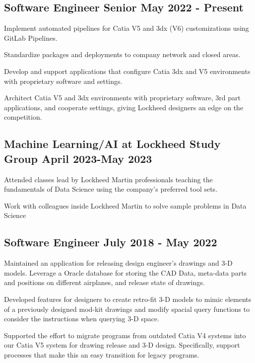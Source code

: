 \subsection{{Software Engineer Senior \hfill May 2022 - Present}}
\begin{zitemize}
\item Implement automated pipelines for Catia V5 and 3dx (V6) customizations using GitLab Pipelines.
\item Standardize packages and deployments to company network and closed areas.
\item Develop and support applications that configure Catia 3dx and V5 environments with proprietary software and settings.
\item Architect Catia V5 and 3dx environments with proprietary software, 3rd part applications, and cooperate settings, giving Lockheed designers an edge on the competition. 
\end{zitemize}

\subsection{{Machine Learning/AI at Lockheed Study Group \hfill April 2023-May 2023}}
\begin{zitemize}
\item Attended classes lead by Lockheed Martin professionals teaching the fundamentals of Data Science using the company's preferred tool sets.
\item Work with colleagues inside Lockheed Martin to solve sample problems in Data Science
\end{zitemize}

\subsection{{Software Engineer \hfill July 2018 - May 2022}}
\begin{zitemize}
\item Maintained an application for releasing design engineer's drawings and 3-D models. Leverage a Oracle database for storing the CAD Data, meta-data parts and positions on different airplanes, and release state of drawings.
\item Developed features for designers to create retro-fit 3-D models to mimic elements of a previously designed mod-kit drawings and modify spacial query functions to consider the instructions when querying 3-D space.
\item Supported the effort to migrate programs from outdated Catia V4 systems into our Catia V5 system for drawing release and 3-D design. Specifically, support processes that make this an easy transition for legacy programs.
\end{zitemize}

